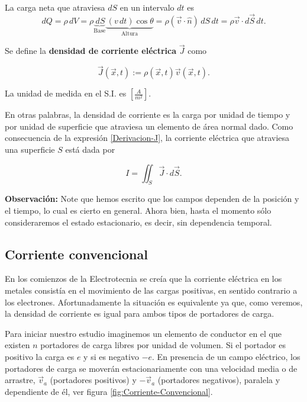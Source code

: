 La carga neta que atraviesa $dS$ en un intervalo $dt$ es
\begin{equation}
  dQ = \rho\,dV = \rho \underbrace{\,dS}_{\text{Base}} \underbrace{\,(v\,dt) \cos \theta}_{\text{Altura}}  = \rho (\Vec{v} \cdot \hat{n}) \,dS\,dt = \rho \Vec{v}\cdot d\Vec{S} \,dt. \label{Derivacion-J}  
\end{equation}

Se define la \textbf{densidad de corriente eléctrica} $\Vec{J}$ como
\begin{shaded}
   $$ \Vec{J}(\Vec{x},t) := \rho(\Vec{x},t) \Vec{v}(\Vec{x},t).$$
\end{shaded}

 La unidad de medida en el S.I. es $\left[\frac{A}{m^2} \right]$.

En otras palabras, la densidad de corriente es la
carga por unidad de tiempo y por unidad de superficie que atraviesa un elemento de área normal dado. Como consecuencia de la expresión \eqref{Derivacion-J}, la corriente eléctrica que atraviesa una superficie $S$ está dada por
\begin{shaded}
    $$I = \iint_S \Vec{J} \cdot d\Vec{S}.$$
\end{shaded}

\textbf{Observación:} Note que hemos escrito que los campos dependen de la posición y el tiempo, lo cual es cierto en general. Ahora bien, hasta el momento sólo consideraremos el estado estacionario, es decir, sin dependencia temporal.

\subsection{Corriente convencional}

En los comienzos de la Electrotecnia se creía que la corriente eléctrica en los metales consistía en el movimiento de las cargas positivas, en sentido contrario a los electrones. Afortunadamente la situación es equivalente ya que, como veremos, la densidad de corriente es igual para ambos tipos de portadores de carga.

Para iniciar nuestro estudio imaginemos un elemento de conductor en el que existen $n$ portadores de carga libres por unidad de volumen. Si el portador es positivo la carga es $e$ y si es negativo $-e$. En presencia de un campo eléctrico, los portadores de carga se moverán estacionariamente con una velocidad media o de arrastre, $\Vec{v}_a$ (portadores positivos) y $-\Vec{v}_a$ (portadores negativos), paralela y dependiente de él, ver figura \ref{fig:Corriente-Convencional}.

